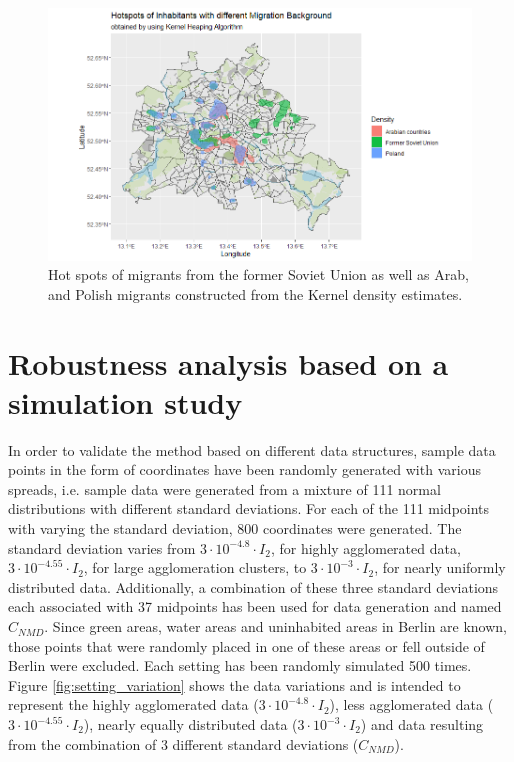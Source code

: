 \begin{figure}[h]
    \centering
    \includegraphics[scale = 0.55]{Figure/KH_Part3.png}
    \caption{Hot spots of migrants from the former Soviet Union as well as Arab, and Polish migrants constructed from the Kernel density estimates.}
    \label{fig:DifferentMigrationHotspots}
\end{figure}

\section{Robustness analysis based on a simulation study}

In order to validate the method based on different data structures, sample data points in the form of coordinates have been randomly generated with various spreads, i.e. sample data were generated from a mixture of 111 normal distributions with different standard deviations. 
For each of the 111 midpoints with varying the standard deviation, 800 coordinates were generated. The standard deviation varies from $3\cdot 10^{-4.8} \cdot I_2$, for highly agglomerated data, 
$3\cdot 10^{-4.55} \cdot I_2$, for large agglomeration clusters, to $3\cdot 10^{-3} \cdot I_2 $, for nearly uniformly distributed data. 
Additionally, a combination of these three standard deviations each associated with 37 midpoints has been used for data generation and named $C_{NMD}$. 
Since green areas, water areas and uninhabited areas in Berlin are known, those points that were randomly placed in one of these areas or fell outside of Berlin were excluded. Each setting has been randomly simulated 500 times. 
Figure \ref{fig:setting_variation} shows the data variations and is intended to represent the highly agglomerated data ($3\cdot 10^{-4.8} \cdot I_2$), less agglomerated data ($3\cdot 10^{-4.55} \cdot I_2$), nearly equally distributed data ($3\cdot 10^{-3} \cdot I_2$) and data resulting from the combination of 3 different standard deviations ($C_{NMD}$).  


